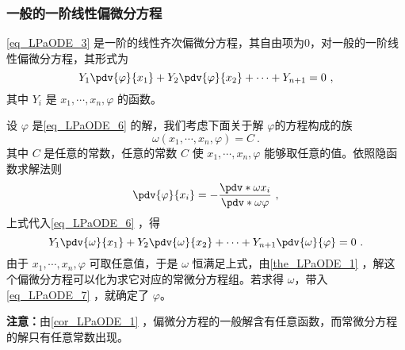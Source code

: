 \subsubsection{一般的一阶线性偏微分方程}
\autoref{eq_LPaODE_3} 是一阶的线性齐次偏微分方程，其自由项为0，对一般的一阶线性偏微分方程，其形式为
\begin{equation}\label{eq_LPaODE_6}
Y_1\pdv{\varphi}{x_1}+Y_2\pdv{\varphi}{x_2}+\cdots+Y_{n+1}=0~,
\end{equation}
其中 $Y_i$ 是 $x_1,\cdots,x_n,\varphi$ 的函数。

设 $\varphi$ 是\autoref{eq_LPaODE_6} 的解，我们考虑下面关于解 $\varphi$的方程构成的族
\begin{equation}\label{eq_LPaODE_7}
\omega(x_1,\cdots,x_n,\varphi)=C~.
\end{equation}
其中 $C$ 是任意的常数，任意的常数 $C$ 使 $x_1,\cdots,x_n,\varphi$ 能够取任意的值。依照隐函数求解法则%
\begin{equation}
\pdv{\varphi}{x_i}=-\frac{\pdv*{\omega}{x_i}}{\pdv*{\omega}{\varphi}}~,
\end{equation}
上式代入\autoref{eq_LPaODE_6} ，得
\begin{equation}
Y_1\pdv{\omega}{x_1}+Y_2\pdv{\omega}{x_2}+\cdots+Y_{n+1}\pdv{\omega}{\varphi}=0~.
\end{equation}
由于 $x_1,\cdots,x_n,\varphi$ 可取任意值，于是 $\omega$ 恒满足上式，由\autoref{the_LPaODE_1} ，解这个偏微分方程可以化为求它对应的常微分方程组。若求得 $\omega$，带入\autoref{eq_LPaODE_7} ，就确定了 $\varphi$。

\textbf{注意：}由\autoref{cor_LPaODE_1} ，偏微分方程的一般解含有任意函数，而常微分方程的解只有任意常数出现。
